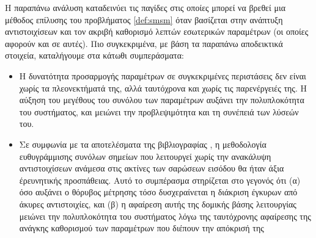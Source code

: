 Η παραπάνω ανάλυση καταδεινύει τις παγίδες στις οποίες μπορεί να βρεθεί μια
μέθοδος επίλυσης του προβλήματος \ref{def:smsm} όταν βασίζεται στην ανάπτυξη
αντιστοιχίσεων και τον ακριβή καθορισμό λεπτών εσωτερικών παραμέτρων (οι οποίες
αφορούν και σε αυτές). Πιο συγκεκριμένα, με βάση τα παραπάνω αποδεικτικά
στοιχεία, καταλήγουμε στα κάτωθι συμπεράσματα:

\begin{itemize}
  \item Η δυνατότητα προσαρμογής παραμέτρων σε συγκεκριμένες περιστάσεις δεν
        είναι χωρίς τα πλεονεκτήματά της, αλλά ταυτόχρονα και χωρίς τις
        παρενέργειές της. Η αύξηση του μεγέθους του συνόλου των παραμέτρων
        αυξάνει την πολυπλοκότητα του συστήματος, και μειώνει την προβλεψιμότητα
        και τη συνέπειά των λύσεών του.

  \item Σε συμφωνία με τα αποτελέσματα της βιβλιογραφίας
        \cite{bernreiter2021phaser}, η μεθοδολογία ευθυγράμμισης συνόλων
        σημείων που λειτουργεί χωρίς την ανακάλυψη αντιστοιχίσεων ανάμεσα στις
        ακτίνες των σαρώσεων εισόδου θα ήταν άξια έρευνητικής προσπάθειας.
        Αυτό το συμπέρασμα στηρίζεται στο γεγονός ότι (α) όσο αυξάνει ο θόρυβος
        μέτρησης τόσο δυσχεραίνεται η διάκριση έγκυρων από άκυρες αντιστοιχίες,
        και (β) η αφαίρεση αυτής της δομικής βάσης λειτουργίας μειώνει την
        πολυπλοκότητα του συστήματος λόγω της ταυτόχρονης αφαίρεσης της ανάγκης
        καθορισμού των παραμέτρων που διέπουν την απόκρισή της
\end{itemize}
